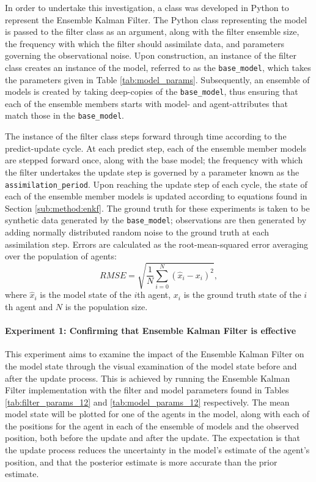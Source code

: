 In order to undertake this investigation, a class was developed in Python to
represent the Ensemble Kalman Filter.
The Python class representing the model is passed to the filter class as an
argument, along with the filter ensemble size, the frequency with which the
filter should assimilate data, and parameters governing the observational noise.
Upon construction, an instance of the filter class creates an instance of the
model, referred to as the \texttt{base\_model}, which takes the parameters given
in Table \ref{tab:model_params}.
Subsequently, an ensemble of models is created by taking deep-copies of the
\texttt{base\_model}, thus ensuring that each of the ensemble members starts
with model- and agent-attributes that match those in the \texttt{base\_model}.

The instance of the filter class steps forward through time according to the
predict-update cycle.
At each predict step, each of the ensemble member models are stepped forward
once, along with the base model; the frequency with which the filter undertakes
the update step is governed by a parameter known as the
\texttt{assimilation\_period}.
Upon reaching the update step of each cycle, the state of each of the ensemble
member models is updated according to equations found in Section
\ref{sub:method:enkf}.
The ground truth for these experiments is taken to be synthetic data generated
by the \texttt{base\_model}; observations are then generated by adding normally
distributed random noise to the ground truth at each assimilation step.
Errors are calculated as the root-mean-squared error averaging over the
population of agents:
\begin{equation*}
    RMSE = \sqrt{\frac{1}{N} \sum_{i=0}^{N}
    \left( \hat{x}_i - x_i \right) ^{2}},
\end{equation*}
where $\hat{x}_i$ is the model state of the $i$th agent, $x_i$ is the ground
truth state of the $i$th agent and $N$ is the population size.

\paragraph{Experiment 1: Confirming that Ensemble Kalman Filter is effective}

This experiment aims to examine the impact of the Ensemble Kalman Filter on the
model state through the visual examination of the model state before and after
the update process.
This is achieved by running the Ensemble Kalman Filter implementation with the
filter and model parameters found in Tables \ref{tab:filter_params_12} and
\ref{tab:model_params_12} respectively.
The mean model state will be plotted for one of the agents in the model, along
with each of the positions for the agent in each of the ensemble of models and
the observed position, both before the update and after the update.
The expectation is that the update process reduces the uncertainty in the
model's estimate of the agent's position, and that the posterior estimate is
more accurate than the prior estimate.

